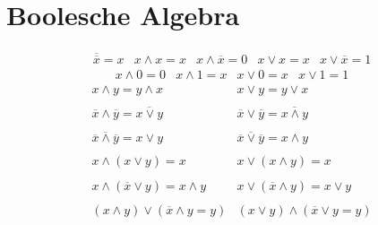 



\section{Boolesche Algebra}
\[ \begin{array}{lllll} \overline{\overline{x}} = x &
x \land x = x & 
x \land \overline{x} = 0 &
x \lor x = x &
x \lor \overline{x} = 1 \end{array} \]
\[ \begin{array}{llll} x \land 0 = 0 & 
x \land 1 = x & 
x \lor 0 = x & 
x \lor 1 = 1 \end{array}\]
\[ \begin{array}{ll}
x \land y = y \land x & 
x \lor y = y \lor x \\\\ 
\overline{x} \land \overline{y} = \overline{x \lor y} & 
\overline{x} \lor \overline{y} = \overline{x \land y} \\\\ 
\overline{\overline{x} \land \overline{y}} = x \lor y & 
\overline{\overline{x} \lor \overline{y}} = x \land y \\\\ 
x \land (x \lor y) = x & x \lor (x \land y) = x \\\\ 
x \land (\overline{x} \lor y) = x \land y & 
x \lor (\overline{x} \land y) = x \lor y \\\\ 
(x \land y) \lor (\overline{x} \land y = y) & 
(x \lor y) \land (\overline{x} \lor y = y) \\ 
\end{array} \]
\[  \]
